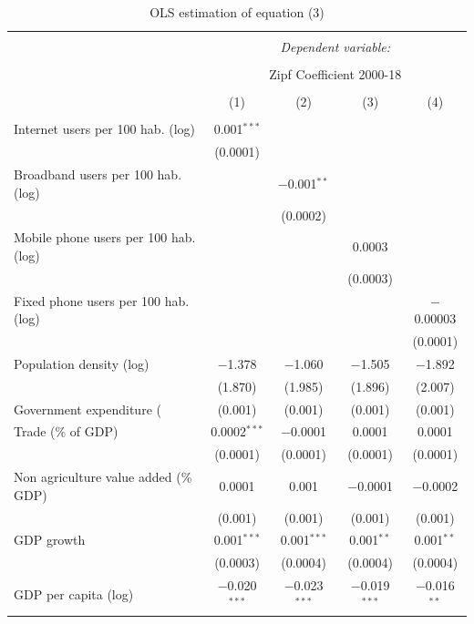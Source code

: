 \documentclass[10pt,letterpaper]{article}
\begin{document}
\begin{table}[!htbp] \centering 
  \caption{OLS estimation of equation (3)\label{ols.global}} 
  \label{} 
\small 
\begin{tabular}{@{\extracolsep{1pt}}lcccc} 
\\[-1.8ex]\hline 
\hline \\[-1.8ex] 
 & \multicolumn{4}{c}{\textit{Dependent variable:}} \\ 
\cline{2-5} 
\\[-1.8ex] & \multicolumn{4}{c}{Zipf Coefficient 2000-18} \\ 
\\[-1.8ex] & (1) & (2) & (3) & (4)\\ 
\hline \\[-1.8ex] 
 Internet users per 100 hab. (log) & 0.001$^{***}$ &  &  &  \\ 
  & (0.0001) &  &  &  \\ 
  Broadband users per 100 hab. (log) &  & $-$0.001$^{**}$ &  &  \\ 
  &  & (0.0002) &  &  \\ 
  Mobile phone users per 100 hab. (log) &  &  & 0.0003 &  \\ 
  &  &  & (0.0003) &  \\ 
  Fixed phone users per 100 hab. (log) &  &  &  & $-$0.00003 \\ 
  &  &  &  & (0.0001) \\ 
  Population density (log) & $-$1.378 & $-$1.060 & $-$1.505 & $-$1.892 \\ 
  & (1.870) & (1.985) & (1.896) & (2.007) \\ 
  Government expenditure (%
  & (0.001) & (0.001) & (0.001) & (0.001) \\ 
  Trade (\% of GDP) & 0.0002$^{***}$ & $-$0.0001 & 0.0001 & 0.0001 \\ 
  & (0.0001) & (0.0001) & (0.0001) & (0.0001) \\ 
  Non agriculture value added (\% GDP) & 0.0001 & 0.001 & $-$0.0001 & $-$0.0002 \\ 
  & (0.001) & (0.001) & (0.001) & (0.001) \\ 
  GDP growth & 0.001$^{***}$ & 0.001$^{***}$ & 0.001$^{**}$ & 0.001$^{**}$ \\ 
  & (0.0003) & (0.0004) & (0.0004) & (0.0004) \\ 
  GDP per capita (log) & $-$0.020$^{***}$ & $-$0.023$^{***}$ & $-$0.019$^{***}$ & $-$0.016$^{**}$ \\ 

\end{tabular}
\end{table}
\end{document}
